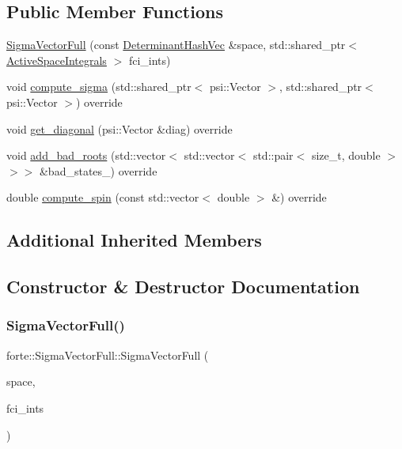 \subsection*{Public Member Functions}
\begin{DoxyCompactItemize}
\item 
\mbox{\hyperlink{classforte_1_1_sigma_vector_full_abb8cd91670c039e1703a1b3e7b8194c6}{Sigma\+Vector\+Full}} (const \mbox{\hyperlink{classforte_1_1_determinant_hash_vec}{Determinant\+Hash\+Vec}} \&space, std\+::shared\+\_\+ptr$<$ \mbox{\hyperlink{classforte_1_1_active_space_integrals}{Active\+Space\+Integrals}} $>$ fci\+\_\+ints)
\item 
void \mbox{\hyperlink{classforte_1_1_sigma_vector_full_a23130725bbc872ce9e86340c3fff49e5}{compute\+\_\+sigma}} (std\+::shared\+\_\+ptr$<$ psi\+::\+Vector $>$, std\+::shared\+\_\+ptr$<$ psi\+::\+Vector $>$) override
\item 
void \mbox{\hyperlink{classforte_1_1_sigma_vector_full_acee1551f85b3f744e12a49ed1e93f942}{get\+\_\+diagonal}} (psi\+::\+Vector \&diag) override
\item 
void \mbox{\hyperlink{classforte_1_1_sigma_vector_full_a231cdb205bf558b4270daae212bd9dc6}{add\+\_\+bad\+\_\+roots}} (std\+::vector$<$ std\+::vector$<$ std\+::pair$<$ size\+\_\+t, double $>$$>$$>$ \&bad\+\_\+states\+\_\+) override
\item 
double \mbox{\hyperlink{classforte_1_1_sigma_vector_full_a7415d04fe0728963ebd1b47871400aff}{compute\+\_\+spin}} (const std\+::vector$<$ double $>$ \&) override
\end{DoxyCompactItemize}
\subsection*{Additional Inherited Members}


\subsection{Constructor \& Destructor Documentation}
\mbox{\label{classforte_1_1_sigma_vector_full_abb8cd91670c039e1703a1b3e7b8194c6}} 
\subsubsection{\texorpdfstring{Sigma\+Vector\+Full()}{SigmaVectorFull()}}
{\footnotesize\ttfamily forte\+::\+Sigma\+Vector\+Full\+::\+Sigma\+Vector\+Full (\begin{DoxyParamCaption}\item[{const \mbox{\hyperlink{classforte_1_1_determinant_hash_vec}{Determinant\+Hash\+Vec}} \&}]{space,  }\item[{std\+::shared\+\_\+ptr$<$ \mbox{\hyperlink{classforte_1_1_active_space_integrals}{Active\+Space\+Integrals}} $>$}]{fci\+\_\+ints }\end{DoxyParamCaption})}



